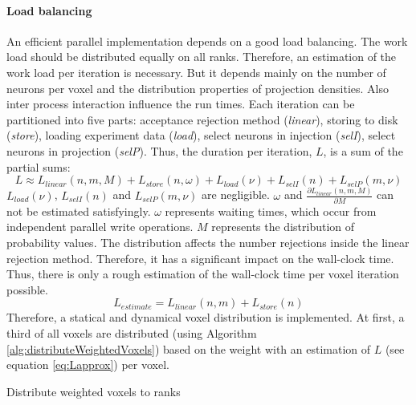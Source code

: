 \paragraph{Load balancing}
\label{par:loadbalancing}
An efficient parallel implementation depends on a good load balancing.
The work load should be distributed equally on all ranks.
Therefore, an estimation of the work load per iteration is necessary.
But it depends mainly on the number of neurons per voxel and the distribution properties of projection densities.
Also inter process interaction influence the run times.
Each iteration can be partitioned into five parts: acceptance rejection method (\emph{linear}), storing to disk (\emph{store}),
loading experiment data (\emph{load}), select neurons in injection (\emph{selI}), select neurons in projection (\emph{selP}).
Thus, the duration per iteration, $L$, is a sum of the partial sums:
\begin{equation} \label{eq:L}
	L \approx L_{linear}(n,m,M) + L_{store}(n,\omega) + L_{load}(\nu) + L_{selI}(n) + L_{selP}(m,\nu)
\end{equation}
$L_{load}(\nu)$, $L_{selI}(n)$ and $L_{selP}(m,\nu)$ are negligible.
$\omega$ and $\frac{\partial L_{linear}(n,m,M)}{\partial M}$  can not be estimated satisfyingly.
$\omega$ represents waiting times, which occur from independent parallel write operations.
$M$ represents the distribution of probability values.
The distribution affects the number rejections inside the linear rejection method.
Therefore, it has a significant impact on the wall-clock time.
Thus, there is only a rough estimation of the wall-clock time per voxel iteration possible.
\begin{equation} \label{eq:Lapprox}
	L_{estimate} = L_{linear}(n,m) + L_{store}(n)
\end{equation}
Therefore, a statical and dynamical voxel distribution is implemented.
At first, a third of all voxels are distributed (using Algorithm \ref{alg:distributeWeightedVoxels}) based on the weight with an estimation
of $L$ (see equation \ref{eq:Lapprox})  per voxel.
\begin{algorithm}[ht!]
\caption{Distribute weighted voxels to ranks}
\label{alg:distributeWeightedVoxels}
\end{algorithm}

